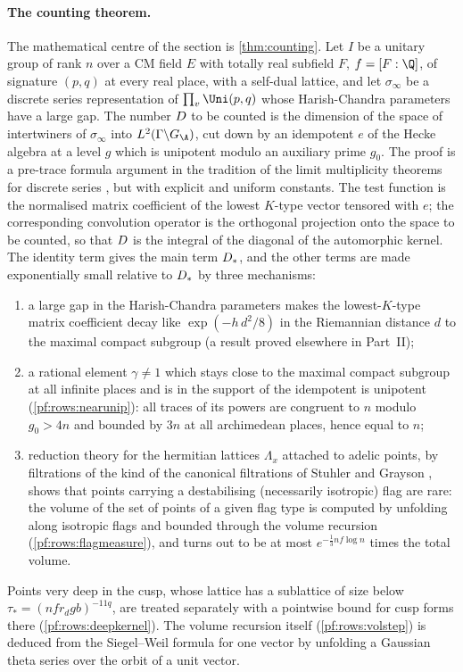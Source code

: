 \paragraph{The counting theorem.}
The mathematical centre of the section is \cref{thm:counting}. Let $I$ be a unitary group of rank $n$ over a
CM field $E$ with totally real subfield $F$, $f=[F:\Q]$, of signature $(p,q)$ at every real place, with a
self-dual lattice, and let $\sigma_\infty$ be a discrete series representation of $\prod_v\Uni(p,q)$ whose
Harish-Chandra parameters have a large gap. The number $D$ to be counted is the dimension of the space of
intertwiners of $\sigma_\infty$ into $L^2(\Gamma\backslash \rowsGA)$, cut down by an idempotent $e$ of the Hecke algebra at
a level $g$ which is unipotent modulo an auxiliary prime $g_0$. The proof is a pre-trace formula argument in the
tradition of the limit multiplicity theorems for discrete series \cite{DeGeorgeWallach1978,Clozel1986,Savin1989},
but with explicit and uniform constants. The test function is the normalised matrix coefficient of the lowest
$K$-type vector tensored with $e$; the corresponding convolution operator is the orthogonal projection onto the
space to be counted, so that $D$ is the integral of the diagonal of the automorphic kernel. The identity term
gives the main term $D_*$, and the other terms are made exponentially small relative to $D_*$ by three
mechanisms:
\begin{enumerate}[label=(\roman*)]
\item a large gap in the Harish-Chandra parameters makes the lowest-$K$-type matrix coefficient decay like
$\exp(-h\,d^2/8)$ in the Riemannian distance $d$ to the maximal compact subgroup (a result proved elsewhere in Part~II);
\item a rational element $\gamma\ne1$ which stays close to the maximal compact subgroup at all infinite places and is
in the support of the idempotent is unipotent (\cref{pf:rows:nearunip}): all traces of its powers are congruent to
$n$ modulo $g_0>4n$ and bounded by $3n$ at all archimedean places, hence equal to $n$;
\item reduction theory for the hermitian lattices $\Lambda_x$ attached to adelic points, by filtrations of the kind of the
canonical filtrations of Stuhler and Grayson \cite{Stuhler1976,Grayson1984}, shows that points carrying a destabilising
(necessarily isotropic) flag are rare: the volume of the set of points of a given flag type is computed by unfolding
along isotropic flags and bounded through the volume recursion (\cref{pf:rows:flagmeasure}), and turns out to be at
most $e^{-\frac13 nf\log n}$ times the total volume.
\end{enumerate}
Points very deep in the cusp, whose lattice has a sublattice of size below $\tau_*=(nfr_dgb)^{-11q}$, are treated
separately with a pointwise bound for cusp forms there (\cref{pf:rows:deepkernel}). The volume recursion itself
(\cref{pf:rows:volstep}) is deduced from the Siegel--Weil formula for one vector by unfolding a Gaussian theta series
over the orbit of a unit vector.

